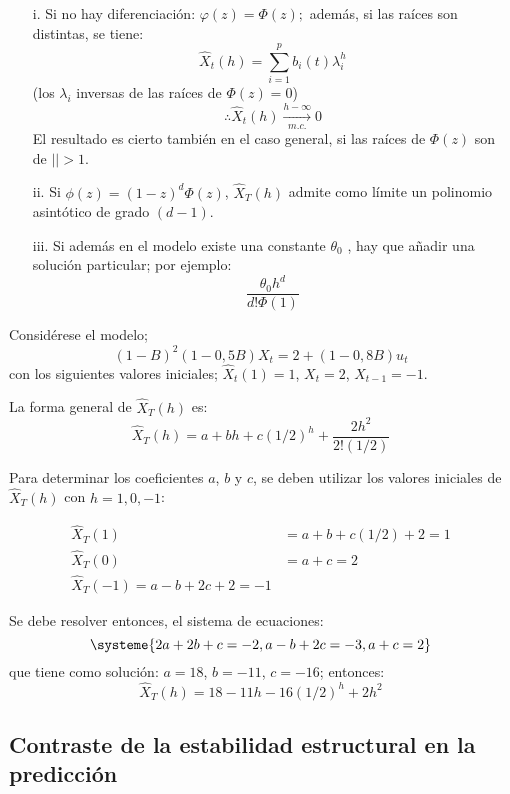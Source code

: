 \begin{observacion}

\begin{enumerate}
\item[i.] Si no hay diferenciaci\'{o}n: $\varphi (z)=\Phi (z);$ adem\'{a}s, si las ra\'{i}ces son distintas, se tiene:
\[
 \widehat{X} _{t} (h)=\sum_{i=1}^p {b_{i} (t)\lambda_{i}^{h} }
\]
(los $\lambda_i$ inversas de las ra\'{i}ces de $\Phi(z)=0$)
\[
\therefore \widehat{X} _{t} (h) \xrightarrow[m.c.]{h-\infty} 0 
\]
El resultado es cierto tambi\'{e}n en el caso general, si las ra\'{i}ces de $\Phi (z)$ son de $\left| \right|>1$.

\item[ii.] Si $\phi(z)=(1-z)^{d} \Phi (z)$, $\widehat{X}_{T}(h)$ admite como l\'{i}mite un polinomio asint\'{o}tico de grado $(d-1)$.

\item[iii.] Si adem\'{a}s en el modelo existe una constante $\theta_{0}$ , hay que a\~{n}adir una soluci\'{o}n particular; por ejemplo:
\[
\frac{\theta_{0} h^{d}}{d!\Phi (1)}
\]
\end{enumerate}
\end{observacion}

\begin{ejemplo}
Consid\'{e}rese el modelo;
\[
(1-B)^{2} (1-0,5B) X_{t}=2+(1- 0,8B) u_{t} 
\]
con los siguientes valores iniciales; $\widehat{X} _{t} (1)= 1$, $X_{t}= 2$, $X_{t-1} =-1$.\newline

La forma general de $\widehat{X} _{T} (h)$ es:
\[
\widehat{X} _{T} (h)= a + bh + c(1/2)^{h} +\frac{2h^{2}}{2!(1/2)}
\]

Para determinar los coeficientes $a$, $b$ y $c$, se deben utilizar los valores iniciales de $\widehat{X} _{T} (h)$ con $h=1, 0, -1$:

\begin{align*}
\widehat{X} _{T} (1)&= a+b+c(1/2)+2 =1\\
\widehat{X} _{T} (0)&= a+c = 2\\
\widehat{X} _{T} (-1)= a- b+ 2c + 2= -1 
\end{align*}

Se debe resolver entonces, el sistema de ecuaciones:
\[
\systeme{ 2a+2b+c=-2, a-b+2c=-3 , a+c=2 }
\]
que tiene como soluci\'{o}n: $a=18$, $b=-11$, $c=-16$; entonces:
\[
 \widehat{X}_{T} (h)=18 - 11 h -16(1/2)^{h} + 2h^{2}
\]
\end{ejemplo}


\subsection{Contraste de la estabilidad estructural en la predicci\'{o}n }

